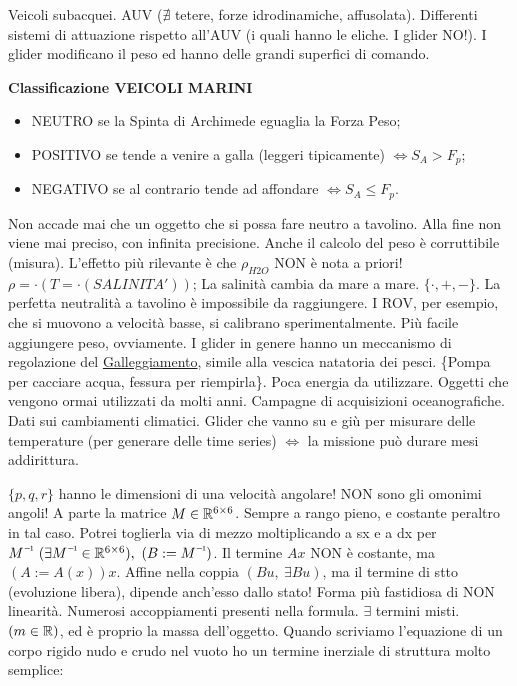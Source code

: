 Veicoli subacquei. AUV ($\nexists$ tetere, forze idrodinamiche, affusolata). Differenti sistemi di attuazione rispetto all'AUV (i quali hanno le eliche. I glider NO!). I glider modificano il peso ed hanno delle grandi superfici di comando.

\begin{defn}{\textbf{Classificazione VEICOLI MARINI}}

\begin{itemize}

\item{NEUTRO} se la Spinta di Archimede eguaglia la Forza Peso;
\item{POSITIVO} se tende a venire a galla (leggeri tipicamente) $\iff S_A > F_p$;
\item{NEGATIVO} se al contrario tende ad affondare $\iff S_A \leq F_p$.
\end{itemize}

\end{defn}

Non accade mai che un oggetto che si possa fare neutro a tavolino. Alla fine non viene mai preciso, con infinita precisione. Anche il calcolo del peso è corruttibile (misura). L'effetto più rilevante è che $\rho_{H2O}$ NON è nota a priori! $\rho = \mathord{\cdot}(T=\mathord{\cdot}(SALINITA'))$; La salinità cambia da mare a mare. $\{\mathord{\cdot},+,-\}$. La perfetta neutralità a tavolino è impossibile da raggiungere. I ROV, per esempio, che si muovono a velocità basse, si calibrano sperimentalmente. Più facile aggiungere peso, ovviamente. I glider in genere hanno un meccanismo di regolazione del \underline{Galleggiamento}, simile alla vescica natatoria dei pesci. \{Pompa per cacciare acqua, fessura per riempirla\}. Poca energia da utilizzare. Oggetti che vengono ormai utilizzati da molti anni. Campagne di acquisizioni oceanografiche. Dati sui cambiamenti climatici. Glider che vanno su e giù per misurare delle temperature (per generare delle time series) $\iff$ la missione può durare mesi addirittura.

$\{p,q,r\}$ hanno le dimensioni di una velocità angolare! NON sono gli omonimi angoli! A parte la matrice $M\in\mathbb{R}^{6\times 6}$. Sempre a rango pieno, e costante peraltro in tal caso. Potrei toglierla via di mezzo moltiplicando a sx e a dx per $\inv{M}\ (\exists\inv{M}\in\R^{6\times 6}),\ (B := \inv{M})$. Il termine $Ax$ NON è costante, ma $(A:=A(x))x$. Affine nella coppia $(Bu,\ \exists Bu)$, ma il termine di stto (evoluzione libera), dipende anch'esso dallo stato! Forma più fastidiosa di NON linearità. Numerosi accoppiamenti presenti nella formula. $\exists$ termini misti. $(m\in\mathbb{R})$, ed è proprio la massa dell'oggetto. Quando scriviamo l'equazione di un corpo rigido nudo e crudo nel vuoto ho un termine inerziale di struttura molto semplice:

